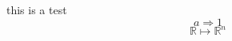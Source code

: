 \documentclass{article}
\begin{document}
	\noindent this is a test
	\[a\Rightarrow1\]
	\[\mathbb{R}\mapsto \mathbb{R}^n\]
\end{document}
